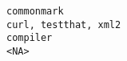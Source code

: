 \documentclass[
  letterpaper,
  DIV=11,
  numbers=noendperiod]{scrreprt}
\begin{document}
\begin{verbatim}
commonmark                                                                                                                                                                                                                                                                                                                                                                                                                                                                                                                                                                                                                                                                                                                                                                                                                                                                                                                                                                                                                                                                                                                                                                                                                                                                               curl, testthat, xml2
compiler                                                                                                                                                                                                                                                                                                                                                                                                                                                                                                                                                                                                                                                                                                                                                                                                                                                                                                                                                                                                                                                                                                                                                                                                                                                                                                 <NA>

\end{verbatim}
\end{document}
